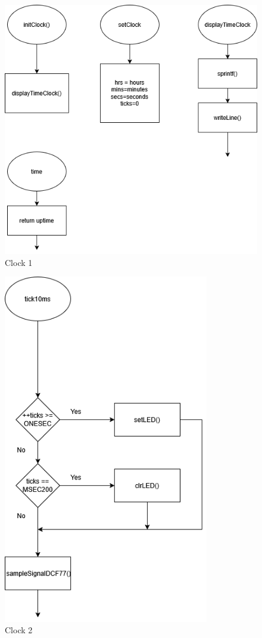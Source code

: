 \documentclass[a4paper,12pt]{article}
\begin{document}
\begin{figure}[H]
    \centering
    \includegraphics[width=1\textwidth]{diagrams/3.clock1.png}
    \caption{Clock 1}
    \label{fig:Clock1}
\end{figure}

\begin{figure}[H]
    \centering
    \includegraphics[width=0.8\textwidth]{diagrams/4.clock2.png}
    \caption{Clock 2}
    \label{fig:Clock2}
\end{figure}
\end{document}
